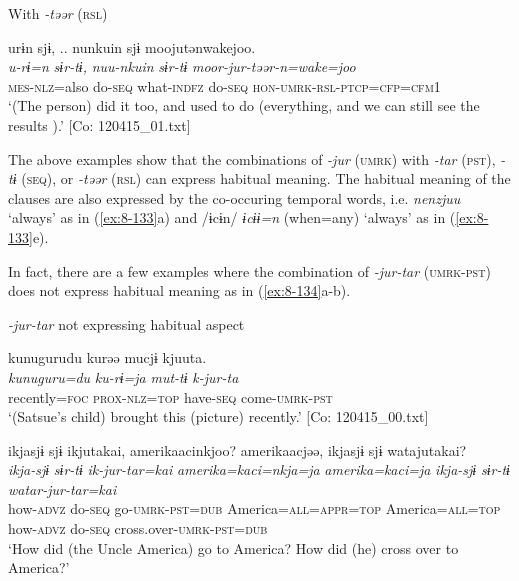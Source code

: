   With \textit{-təər} (\textsc{rsl})

\ex
{\TM}
\glll  urɨn  sjɨ, ..  nunkuin  sjɨ      moojutənwakejoo.\\
\textit{u-rɨ=n}  \textit{sɨr-tɨ,}  \textit{nuu-nkuin}  \textit{sɨr-tɨ}    \textit{moor-jur-təər-n=wake=joo}\\
\textsc{mes}-\textsc{nlz}=also  do-\textsc{seq}  what-\textsc{indfz}  do-\textsc{seq}  \textsc{hon}-\textsc{umrk}-\textsc{rsl}-\textsc{ptcp}=\textsc{cfp}=\textsc{cfm1}\\
\glt ‘(The person) did it too, and used to do (everything, and we can still see the results ).’ [Co: 120415\_01.txt]
\z
\z

The above examples show that the combinations of \textit{-jur} (\textsc{umrk}) with \textit{-tar} (\textsc{pst}), \textit{-tɨ} (\textsc{seq}), or \textit{-təər} (\textsc{rsl}) can express habitual meaning. The habitual meaning of the clauses are also expressed by the co-occuring temporal words, i.e. \textit{nenzjuu} ‘always’ as in (\ref{ex:8-133}a) and /ɨcɨn/ \textit{ɨcɨɨ=n} (when=any) ‘always’ as in (\ref{ex:8-133}e).

  In fact, there are a few examples where the combination of \textit{-jur-tar} (\textsc{umrk}-\textsc{pst}) does not express habitual meaning as in (\ref{ex:8-134}a-b).

\ea\label{ex:8-134}
  \textit{-jur-tar} not expressing habitual aspect

\ea
{\TM}
\glll  kunugurudu  kurəə  mucjɨ  kjuuta.\\
\textit{kunuguru=du}  \textit{ku-rɨ=ja}  \textit{mut-tɨ}  \textit{k-jur-ta}\\
recently=\textsc{foc}  \textsc{prox}-\textsc{nlz}=\textsc{top}  have-\textsc{seq}  come-\textsc{umrk}-\textsc{pst}\\
\glt ‘(Satsue’s child) brought this (picture) recently.’ [Co: 120415\_00.txt]


{\TM}
\glll  ikjasjɨ  sjɨ  ikjutakai,  amerikaacinkjoo?    amerikaacjəə,  ikjasjɨ  sjɨ  watajutakai?
\\
\textit{ikja-sjɨ}  \textit{sɨr-tɨ}  \textit{ik-jur-tar=kai}  \textit{amerika=kaci=nkja=ja}    \textit{amerika=kaci=ja}  \textit{ikja-sjɨ}  \textit{sɨr-tɨ}  \textit{watar-jur-tar=kai}\\
how-\textsc{advz}  do-\textsc{seq}  go-\textsc{umrk}-\textsc{pst}=\textsc{dub}  America=\textsc{all}=\textsc{appr}=\textsc{top}  America=\textsc{all}=\textsc{top}  how-\textsc{advz}  do-\textsc{seq}  cross.over-\textsc{umrk}-\textsc{pst}=\textsc{dub}\\
\glt ‘How did (the Uncle America) go to America? How did (he) cross over to America?’

